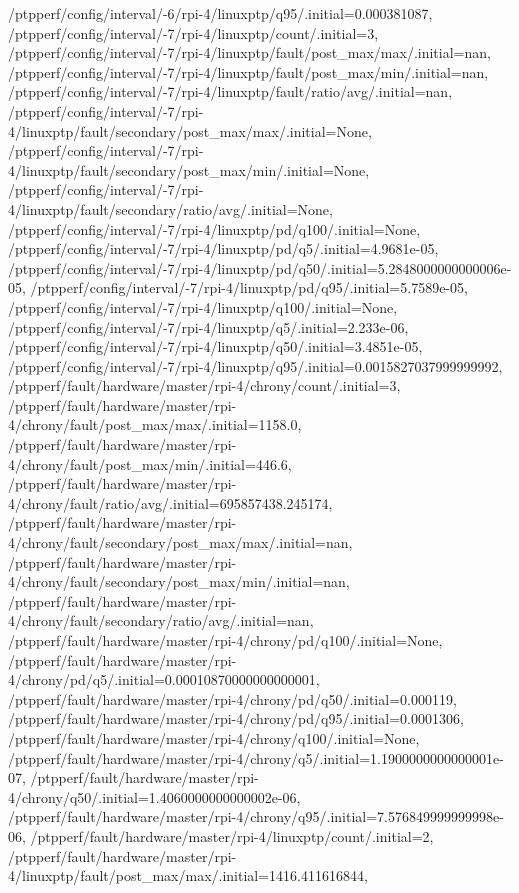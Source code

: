 {    /ptpperf/config/interval/-6/rpi-4/linuxptp/q95/.initial=0.000381087,
    /ptpperf/config/interval/-7/rpi-4/linuxptp/count/.initial=3,
    /ptpperf/config/interval/-7/rpi-4/linuxptp/fault/post_max/max/.initial=nan,
    /ptpperf/config/interval/-7/rpi-4/linuxptp/fault/post_max/min/.initial=nan,
    /ptpperf/config/interval/-7/rpi-4/linuxptp/fault/ratio/avg/.initial=nan,
    /ptpperf/config/interval/-7/rpi-4/linuxptp/fault/secondary/post_max/max/.initial=None,
    /ptpperf/config/interval/-7/rpi-4/linuxptp/fault/secondary/post_max/min/.initial=None,
    /ptpperf/config/interval/-7/rpi-4/linuxptp/fault/secondary/ratio/avg/.initial=None,
    /ptpperf/config/interval/-7/rpi-4/linuxptp/pd/q100/.initial=None,
    /ptpperf/config/interval/-7/rpi-4/linuxptp/pd/q5/.initial=4.9681e-05,
    /ptpperf/config/interval/-7/rpi-4/linuxptp/pd/q50/.initial=5.2848000000000006e-05,
    /ptpperf/config/interval/-7/rpi-4/linuxptp/pd/q95/.initial=5.7589e-05,
    /ptpperf/config/interval/-7/rpi-4/linuxptp/q100/.initial=None,
    /ptpperf/config/interval/-7/rpi-4/linuxptp/q5/.initial=2.233e-06,
    /ptpperf/config/interval/-7/rpi-4/linuxptp/q50/.initial=3.4851e-05,
    /ptpperf/config/interval/-7/rpi-4/linuxptp/q95/.initial=0.0015827037999999992,
    /ptpperf/fault/hardware/master/rpi-4/chrony/count/.initial=3,
    /ptpperf/fault/hardware/master/rpi-4/chrony/fault/post_max/max/.initial=1158.0,
    /ptpperf/fault/hardware/master/rpi-4/chrony/fault/post_max/min/.initial=446.6,
    /ptpperf/fault/hardware/master/rpi-4/chrony/fault/ratio/avg/.initial=695857438.245174,
    /ptpperf/fault/hardware/master/rpi-4/chrony/fault/secondary/post_max/max/.initial=nan,
    /ptpperf/fault/hardware/master/rpi-4/chrony/fault/secondary/post_max/min/.initial=nan,
    /ptpperf/fault/hardware/master/rpi-4/chrony/fault/secondary/ratio/avg/.initial=nan,
    /ptpperf/fault/hardware/master/rpi-4/chrony/pd/q100/.initial=None,
    /ptpperf/fault/hardware/master/rpi-4/chrony/pd/q5/.initial=0.00010870000000000001,
    /ptpperf/fault/hardware/master/rpi-4/chrony/pd/q50/.initial=0.000119,
    /ptpperf/fault/hardware/master/rpi-4/chrony/pd/q95/.initial=0.0001306,
    /ptpperf/fault/hardware/master/rpi-4/chrony/q100/.initial=None,
    /ptpperf/fault/hardware/master/rpi-4/chrony/q5/.initial=1.1900000000000001e-07,
    /ptpperf/fault/hardware/master/rpi-4/chrony/q50/.initial=1.4060000000000002e-06,
    /ptpperf/fault/hardware/master/rpi-4/chrony/q95/.initial=7.576849999999998e-06,
    /ptpperf/fault/hardware/master/rpi-4/linuxptp/count/.initial=2,
    /ptpperf/fault/hardware/master/rpi-4/linuxptp/fault/post_max/max/.initial=1416.411616844,
}
